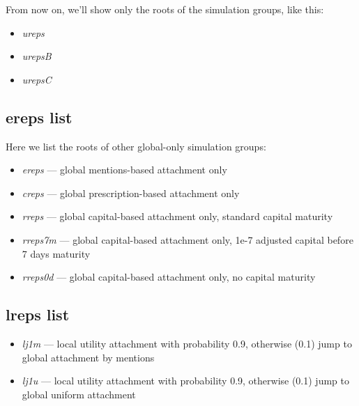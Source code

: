 \documentclass[10pt,oneside]{memoir}
\begin{document}
\begin{Spacing}{2}
\begin{itemize}
\end{itemize}

From now on, we'll show only the roots of the simulation groups, like this:


\begin{itemize}


\item {\itshape ureps}

\item {\itshape urepsB}

\item {\itshape urepsC}
\end{itemize}

\pagebreak \subsection{ereps list}
\label{erepslist}

Here we list the roots of other global-only simulation groups:


\begin{itemize}


\item {\itshape ereps} --- global mentions-based attachment only

\item {\itshape creps} --- global prescription-based attachment only

\item {\itshape rreps} --- global capital-based attachment only, standard capital maturity

\item {\itshape rreps7m} --- global capital-based attachment only,  1e-7 adjusted capital before 7 days maturity

\item {\itshape rreps0d} --- global capital-based attachment only, no capital maturity
\end{itemize}

\pagebreak \subsection{lreps list}
\label{lrepslist}

\begin{itemize}


\item {\itshape lj1m} --- local utility attachment with probability 0.9, otherwise (0.1) jump to global attachment by mentions

\item {\itshape lj1u} --- local utility attachment with probability 0.9, otherwise (0.1) jump to global uniform attachment


\end{itemize}
\end{Spacing}
\end{document}

